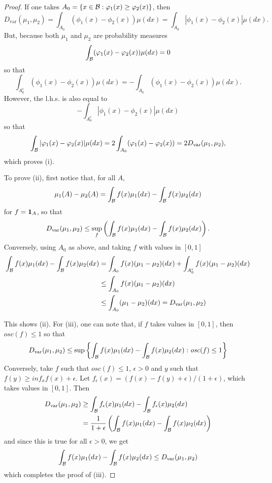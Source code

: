 \begin{proof}
If one takes $A_0= \{x\in {\mathcal B}: \varphi_1(x) \geq \varphi_2(x)\}$, then
\[
D_{\mathrm{var}}(\mu_1,\mu_2)  = \int_{A_0} (\phi_1(x) - \phi_2(x))\mu(dx) = \int_{A_0} |\phi_1(x) - \phi_2(x)|\mu(dx).
\]
But, because both $\mu_1$ and $\mu_2$ are probability measures
\[
\int_{{\mathcal B}} (\varphi_1(x) - \varphi_2(x))\mu(dx) = 0
\]
so that 
\[
\int_{A_0^c} (\phi_1(x) - \phi_2(x))\mu(dx) = - \int_{A_0} (\phi_1(x) - \phi_2(x))\mu(dx).
\]
However, the l.h.s. is also equal to 
\[
- \int_{A_0^c} |\phi_1(x) - \phi_2(x)|\mu(dx)
\]
so that 
\[
\int_{{\mathcal B}} |\varphi_1(x) - \varphi_2(x)|\mu(dx) = 2 \int_{A_0} (\varphi_1(x) - \varphi_2(x)) = 2 D_{\mathrm{var}}(\mu_1,\mu_2),
\]
which proves (i). 


To prove (ii), first notice that, for all $A$, 
\[
\mu_1(A) - \mu_2(A) = \int_{\mathcal B} f(x) \mu_1(dx) - \int_{\mathcal B} f(x) \mu_2(dx)
\]
for $f = {\bm 1}_A$, so that 
\[
D_{\mathrm{var}}(\mu_1,\mu_2)  \leq \sup_f\left(\int_{\mathcal B} f(x) \mu_1(dx) - \int_{\mathcal B} f(x) \mu_2(dx)\right).
\]
Conversely, using $A_0$ as above, and taking $f$ with values in $[0,1]$
\begin{align*}
\int_{\mathcal B} f(x) \mu_1(dx) - \int_{\mathcal B} f(x) \mu_2(dx) &= 
\int_{A_0} f(x) (\mu_1-\mu_2)(dx) + 
\int_{A_0^c} f(x) (\mu_1-\mu_2)(dx) \\
&\leq 
\int_{A_0} f(x) (\mu_1-\mu_2)(dx)\\ 
&\leq 
\int_{A_0} (\mu_1-\mu_2)(dx) =  D_{\mathrm{var}}(\mu_1,\mu_2)
\end{align*}

This shows (ii). For (iii), one can note that, if $f$ takes values in $[0,1]$, then $\mathit{osc}(f) \leq 1$ so that 
\[
D_{\mathrm{var}}(\mu_1,\mu_2) \leq \sup\left\{ \int_{{\mathcal B}} f(x) \mu_1(dx) - \int_{{\mathcal B}} f(x) \mu_2(dx) : \mathit{osc}(f) \leq 1\right\}
\] 
Conversely, take $f$ such that $\mathit{osc}(f) \leq 1$, $\epsilon > 0$ and $y$ such that $f(y) \geq inf_x f(x) + \epsilon$. Let $f_\epsilon(x) = (f(x) - f(y) + \epsilon)/(1+\epsilon)$, which takes values in $[0,1]$. Then
\begin{align*}
D_{\mathrm{var}}(\mu_1,\mu_2) &\geq 
\int_{\mathcal B} f_\epsilon(x) \mu_1(dx) - \int_{\mathcal B} f_\epsilon(x) \mu_2(dx)\\
&= \frac{1}{1+\epsilon}\left(
\int_{\mathcal B} f(x) \mu_1(dx) - \int_{\mathcal B} f(x) \mu_2(dx)\right)
\end{align*}
and since this is true for all $\epsilon>0$, we get
\[
\int_{\mathcal B} f(x) \mu_1(dx) - \int_{\mathcal B} f(x) \mu_2(dx)\leq D_{\mathrm{var}}(\mu_1,\mu_2)
\]
which completes the proof of (iii). 


\end{proof}
